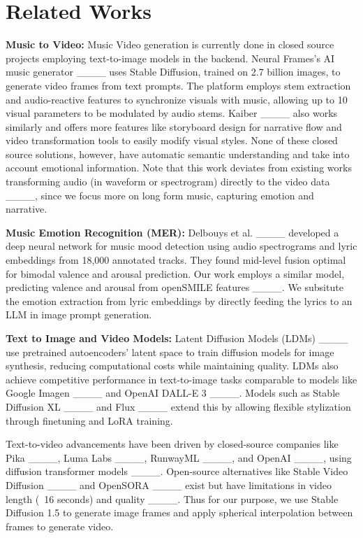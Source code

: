 \section{Related Works}
\textbf{Music to Video:} Music Video generation is currently done in closed source projects employing text-to-image models in the backend. Neural Frames's AI music generator ____ uses Stable Diffusion, trained on 2.7 billion images, to generate video frames from text prompts. The platform employs stem extraction and audio-reactive features to synchronize visuals with music, allowing up to 10 visual parameters to be modulated by audio stems. Kaiber ____ also works similarly and offers more features like storyboard design for narrative flow and video transformation tools to easily modify visual styles. None of these closed source solutions, however, have automatic semantic understanding and take into account emotional information. Note that this work deviates from existing works transforming audio (in waveform or spectrogram) directly to the video data ____, since we focus more on long form music, capturing emotion and narrative.

\textbf{Music Emotion Recognition (MER):} Delbouys et al. ____ developed a deep neural network for music mood detection using audio spectrograms and lyric embeddings from 18,000 annotated tracks. They found mid-level fusion optimal for bimodal valence and arousal prediction. Our work employs a similar model, predicting valence and arousal from openSMILE features ____. We subsitute the emotion extraction from lyric embeddings by directly feeding the lyrics to an LLM in image prompt generation.

\textbf{Text to Image and Video Models:} Latent Diffusion Models (LDMs) ____ use pretrained autoencoders' latent space to train diffusion models for image synthesis, reducing computational costs while maintaining quality. LDMs also achieve competitive performance in text-to-image tasks comparable to models like Google Imagen ____ and OpenAI DALL-E 3 ____. Models such as Stable Diffusion XL ____ and Flux ____ extend this by allowing flexible stylization through finetuning and LoRA training. 

Text-to-video advancements have been driven by closed-source companies like Pika ____, Luma Labs ____, RunwayML ____, and OpenAI ____, using diffusion transformer models ____. Open-source alternatives like Stable Video Diffusion ____ and OpenSORA ____ exist but have limitations in video length (~16 seconds) and quality ____. Thus for our purpose, we use Stable Diffusion 1.5 to generate image frames and apply spherical interpolation between frames to generate video.

